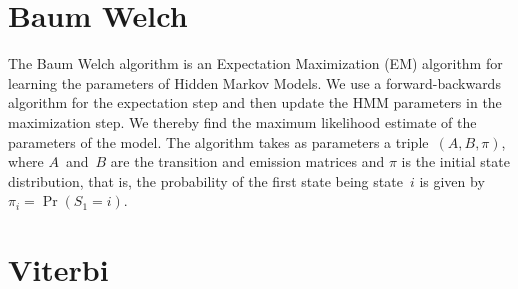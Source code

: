 \documentclass[twoside]{article}
\begin{document}
\section{Baum Welch}\label{sec:baum-welch}

The Baum Welch algorithm is an Expectation Maximization (EM) algorithm for learning the parameters of Hidden Markov Models.
We use a forward-backwards algorithm for the expectation step and then update the HMM parameters in the maximization step.
We thereby find the maximum likelihood estimate of the parameters of the model.
The algorithm takes as parameters a triple~$(A, B, \pi)$, where $A$~and~$B$ are the transition and emission matrices and $\pi$ is the initial state distribution, that is, the probability of the first state being state~$i$ is given by ${\pi_i = \Pr(S_1 = i)}$.




\section{Viterbi}\label{sec:viterbi}
\end{document}
